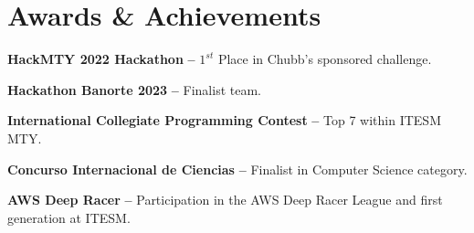 \documentclass[letterpaper,11pt]{article}
\makeatletter
\newcommand{\resumeItem}[1]{
  \item\small{
    {#1 \vspace{-2pt}}
  }
}
\newcommand{\resumeProjectHeading}[2]{
    \vspace{-2pt}\item
    \begin{tabular*}{0.97\textwidth}{l@{\extracolsep{\fill}}r}
      \small#1 & #2 \\
    \end{tabular*}\vspace{-7pt}
}
\newcommand{\resumeSubHeadingListStart}{\begin{itemize}[leftmargin=0.15in, label={}]}
\newcommand{\resumeSubHeadingListEnd}{\end{itemize}}
\newcommand{\resumeItemListStart}{\begin{itemize}}
\newcommand{\resumeItemListEnd}{\end{itemize}\vspace{-5pt}}
\makeatother
\begin{document}
\section{Awards \& Achievements}
  \vspace{2pt}
  \resumeSubHeadingListStart
    \small{\item{
        \textbf{HackMTY 2022 Hackathon} \textbf{--} { $1^{st}$ Place in Chubb's sponsored challenge. } \\ \vspace{2pt}
        
	\textbf{Hackathon Banorte 2023} \textbf{--} { Finalist team. } \\ \vspace{2pt}
        
	\textbf{International Collegiate Programming Contest} \textbf{--} { Top 7 within ITESM MTY. } \\ \vspace{2pt}
        
	\textbf{Concurso Internacional de Ciencias} \textbf{--} { Finalist in Computer Science category.} \\ \vspace{2pt}
	
	\textbf{AWS Deep Racer} \textbf{--} { Participation in the AWS Deep Racer League and first generation at ITESM.}
    }}
  \resumeSubHeadingListEnd




%       
%       
\end{document}
